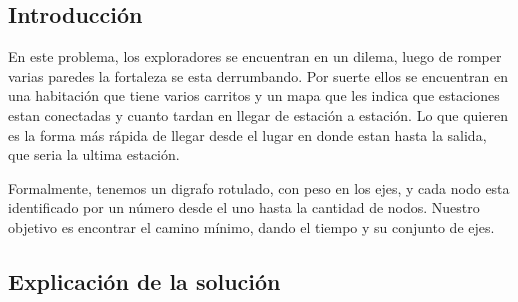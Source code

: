 \documentclass[spanish,12pt]{article}
\begin{document}
\subsection{Introducción}

En este problema, los exploradores se encuentran en un dilema, luego de romper varias paredes la fortaleza se esta derrumbando. Por suerte ellos se encuentran en una habitación que tiene varios carritos y un mapa que les indica que estaciones estan conectadas y cuanto tardan en llegar de estación a estación. Lo que quieren es la forma más rápida de llegar desde el lugar en donde estan hasta la salida, que seria la ultima estación.

Formalmente, tenemos un digrafo rotulado, con peso en los ejes, y cada nodo esta identificado por un número desde el uno hasta la cantidad de nodos. Nuestro objetivo es encontrar el camino mínimo, dando el tiempo y su conjunto de ejes.


\subsection{Explicación de la solución}
\end{document}
